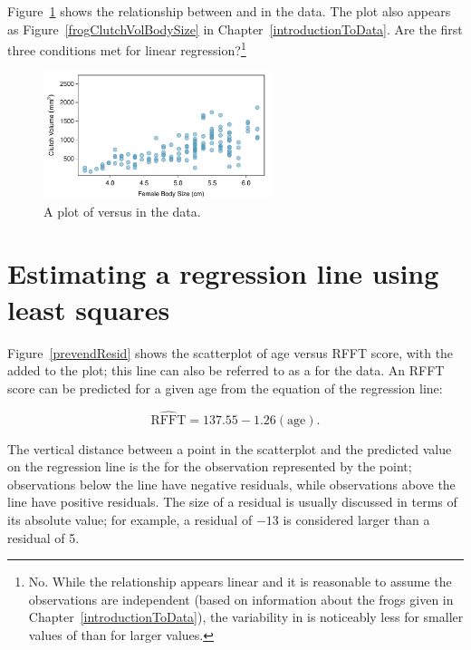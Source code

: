 \begin{exercise} \label{nonConstantVariance}
Figure~\ref{frogClutchVolBodySizeRegress} shows the relationship between  and  in the  data.  The plot also appears as Figure~\ref{frogClutchVolBodySize} in Chapter~\ref{introductionToData}. Are the first three conditions met for linear regression?\footnote{No. While the relationship appears linear and it is reasonable to assume the observations are independent (based on information about the frogs given in Chapter~\ref{introductionToData}), the variability in  is noticeably less for smaller values of  than for larger values.}

\begin{figure}[h!]
	\centering
	\includegraphics[width=0.6\textwidth]
	{ch_intro_to_data_oi_biostat/figures/frogClutchVolBodySize/frogClutchVolBodySize}
	\caption{A plot of  versus  in the  data.}
	\label{frogClutchVolBodySizeRegress}
\end{figure}


\end{exercise}

\newpage

\section{Estimating a regression line using least squares}
\label{estimatingLeastSquaresLine}


Figure~\ref{prevendResid} shows the scatterplot of age versus RFFT score, with the  added to the plot; this line can also be referred to as a  for the data. An RFFT score can be predicted for a given age from the equation of the regression line:

\[\widehat{\text{RFFT}} = 137.55 - 1.26(\text{age}). \]


The vertical distance between a point in the scatterplot and the predicted value on the regression line is the  for the observation represented by the point; observations below the line have negative residuals, while observations above the line have positive residuals. The size of a residual is usually discussed in terms of its absolute value; for example, a residual of $-13$ is considered larger than a residual of 5.

